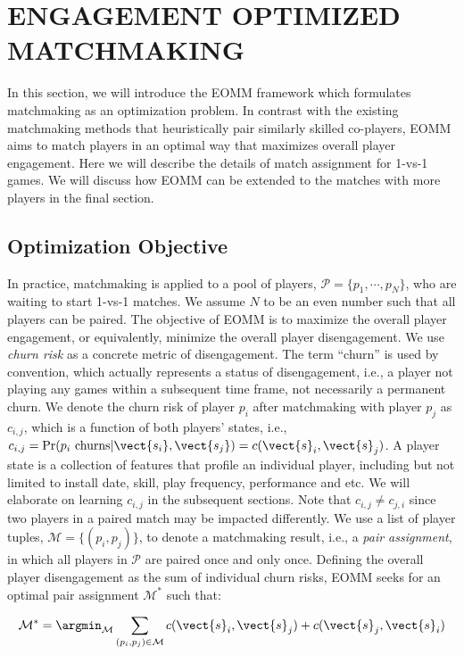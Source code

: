 \section{ENGAGEMENT OPTIMIZED \\ MATCHMAKING}\label{sec:optimization}
In this section, we will introduce the EOMM framework which formulates matchmaking as an optimization problem. In contrast with the existing matchmaking methods that heuristically pair similarly skilled co-players, EOMM aims to match players in an optimal way that maximizes overall player engagement. Here we will describe the details of match assignment for 1-vs-1 games. We will discuss how EOMM can be extended to the matches with more players in the final section.

\subsection{Optimization Objective}
In practice, matchmaking is applied to a pool of players, $\mathcal{P}=\{p_1, \cdots, p_N\}$, who are waiting to start 1-vs-1 matches. We assume $N$ to be an even number such that all players can be paired. The objective of EOMM is to maximize the overall player engagement, or equivalently, minimize the overall player disengagement. We use \emph{churn risk} as a concrete metric of disengagement. The term ``churn'' is used by convention, which actually represents a status of disengagement, i.e., a player not playing any games within a subsequent time frame, not necessarily a permanent churn. We denote the churn risk of player $p_i$ after matchmaking with player $p_j$ as $c_{i,j}$, which is a function of both players' states, i.e., $c_{i,j}=\Pr(p_i \text{ churns} | \vect{s_i}, \vect{s_j})=c(\vect{s}_i, \vect{s}_j)$. A player state is a collection of features that profile an individual player, including but not limited to install date, skill, play frequency, performance and etc. We will elaborate on learning $c_{i,j}$ in the subsequent sections. Note that $c_{i,j}\neq c_{j,i}$ since two players in a paired match may be impacted differently. We use a list of player tuples, $\mathcal{M}=\{(p_i,p_j)\}$, to denote a matchmaking result, i.e., a \textit{pair assignment}, in which all players in $\mathcal{P}$ are paired once and only once. Defining the overall player disengagement as the sum of individual churn risks, EOMM seeks for an optimal pair assignment $\mathcal{M}^*$ such that:

\begin{align}
\mathcal{M}^* = \argmin_{\mathcal{M}} \sum\limits_{(p_i, p_j)\in \mathcal{M}} c(\vect{s}_i, \vect{s}_j) + c(\vect{s}_j, \vect{s}_i) \label{eqn:opt2}
\end{align}

